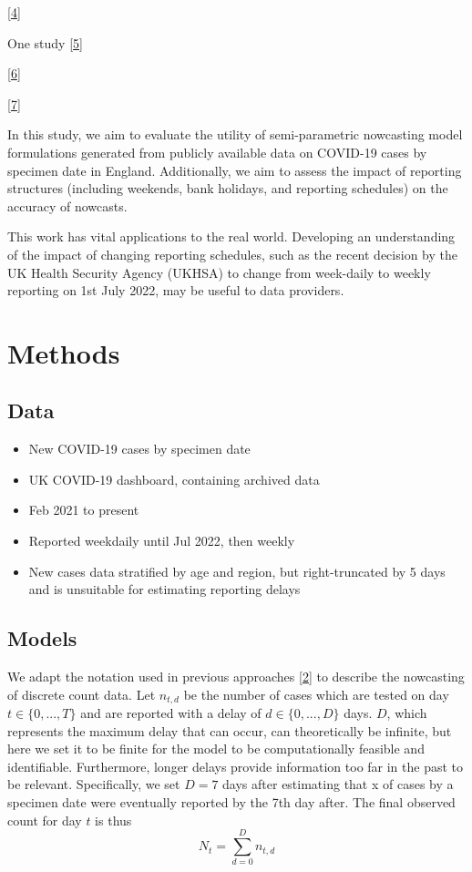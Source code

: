 \documentclass[
  a4paper,
]{article}
\providecommand{\tightlist}{%
  \setlength{\itemsep}{0pt}\setlength{\parskip}{0pt}}\usepackage{longtable,booktabs,array}
\begin{document}
\protect\hyperlink{ref-schneble2021}{{[}4{]}}

One study \protect\hyperlink{ref-seaman2022}{{[}5{]}}

\protect\hyperlink{ref-abbott2021}{{[}6{]}}

\protect\hyperlink{ref-guxfcnther2021}{{[}7{]}}

In this study, we aim to evaluate the utility of semi-parametric
nowcasting model formulations generated from publicly available data on
COVID-19 cases by specimen date in England. Additionally, we aim to
assess the impact of reporting structures (including weekends, bank
holidays, and reporting schedules) on the accuracy of nowcasts.

This work has vital applications to the real world. Developing an
understanding of the impact of changing reporting schedules, such as the
recent decision by the UK Health Security Agency (UKHSA) to change from
week-daily to weekly reporting on 1st July 2022, may be useful to data
providers.

\hypertarget{methods}{%
\section{Methods}\label{methods}}

\hypertarget{data}{%
\subsection{Data}\label{data}}

\begin{itemize}
\tightlist
\item
  New COVID-19 cases by specimen date
\item
  UK COVID-19 dashboard, containing archived data
\item
  Feb 2021 to present
\item
  Reported weekdaily until Jul 2022, then weekly
\item
  New cases data stratified by age and region, but right-truncated by 5
  days and is unsuitable for estimating reporting delays
\end{itemize}

\hypertarget{models}{%
\subsection{Models}\label{models}}

We adapt the notation used in previous approaches
\protect\hyperlink{ref-lawless1994}{{[}2{]}} to describe the nowcasting
of discrete count data. Let \(n_{t,d}\) be the number of cases which are
tested on day \(t\in \{0,...,T\}\) and are reported with a delay of
\(d\in\{0,...,D\}\) days. \(D\), which represents the maximum delay that
can occur, can theoretically be infinite, but here we set it to be
finite for the model to be computationally feasible and identifiable.
Furthermore, longer delays provide information too far in the past to be
relevant. Specifically, we set \(D=7\) days after estimating that x of
cases by a specimen date were eventually reported by the 7th day after.
The final observed count for day \(t\) is thus
\[N_{t} = \sum_{d=0}^D n_{t,d}\]
\end{document}
